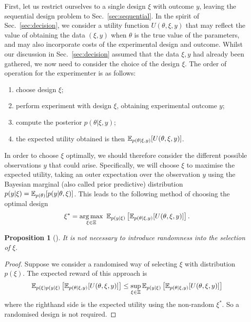 \documentclass[a4paper, 10pt]{report}
\theoremstyle{plain}
\newtheorem{proposition}[theorem]{Proposition}
\begin{document}
	First, let us restrict ourselves to a single design $\xi$ with outcome $y$, leaving the sequential design problem to Sec.~\ref{sec:sequential}.
	In the spirit of Sec.~\ref{sec:decision}, we consider a utility function $U(\theta,\xi,y)$ that may reflect the value of obtaining the data $(\xi, y)$ when $\theta$ is the true value of the parameters, and may also incorporate costs of the experimental design and outcome.
	Whilst our discussion in Sec.~\ref{sec:decision} assumed that the data $\xi,y$ had already been gathered, we now need to consider the choice of the design $\xi$. The order of operation for the experimenter is as follows:
	\begin{enumerate}
		\item choose design $\xi$;
		\item perform experiment with design $\xi$, obtaining experimental outcome $y$;
		\item compute the posterior $p(\theta|\xi,y)$;
		\item the expected utility obtained is then $\mathbb{E}_{p(\theta|\xi,y)}[U(\theta,\xi,y)]$.
	\end{enumerate}
	In order to choose $\xi$ optimally, we should therefore consider the different possible observations $y$ that could arise.
	Specifically, we will choose $\xi$ to maximise the expected utility, taking an outer expectation over the observation $y$ using the Bayesian marginal (also called prior predictive) distribution $p(y|\xi) = \mathbb{E}_{p(\theta)}[p(y|\theta,\xi)]$.
	This leads to the following method of choosing the optimal design
	\begin{equation}
	\label{eq:general_u}
	\xi^* = \operatorname*{arg\,max}_{\xi\in\Xi}\ \mathbb{E}_{p(y|\xi)} \left[ \mathbb{E}_{p(\theta|\xi,y)}[U(\theta,\xi,y)] \right].
	\end{equation}
	\begin{proposition}[\citet{lindley1972}]
		It is not necessary to introduce randomness into the selection of $\xi$.
	\end{proposition}
	\begin{proof}
		Suppose we consider a randomised way of selecting $\xi$ with distribution $p(\xi)$. The expected reward of this approach is
		\begin{equation}
		\begin{split}
		\mathbb{E}_{p(\xi)p(y|\xi)} \left[  \mathbb{E}_{p(\theta|\xi,y)}[U(\theta,\xi,y)] \right]
		\le \sup_{\xi\in\Xi} \mathbb{E}_{p(y|\xi)} \left[ \mathbb{E}_{p(\theta|\xi,y)}[U(\theta,\xi,y)] \right]
		\end{split}
		\end{equation}
		where the righthand side is the expected utility using the non-random $\xi^*$.
		So a randomised design is not required.
	\end{proof}
	
\end{document}
